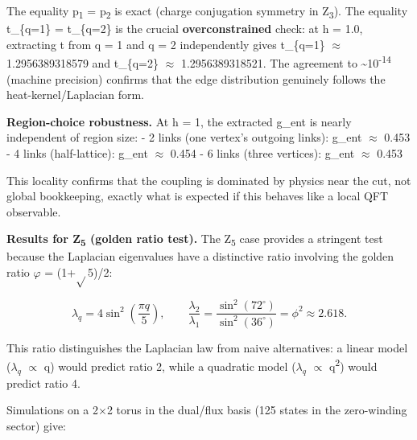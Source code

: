\documentclass[11pt,a4paper]{article}
\theoremstyle{remark}
\begin{document}
The equality p\textsubscript{1} = p\textsubscript{2} is exact (charge conjugation symmetry in Z\textsubscript{3}).
The equality t\_\{q=1\} = t\_\{q=2\} is the crucial \textbf{overconstrained} check: at
h = 1.0, extracting t from q = 1 and q = 2 independently gives
t\_\{q=1\} \ensuremath{\approx} 1.2956389318579 and t\_\{q=2\} \ensuremath{\approx} 1.2956389318521. The
agreement to \textasciitilde10\textsuperscript{-14} (machine precision) confirms that the edge
distribution genuinely follows the heat-kernel/Laplacian form.

\textbf{Region-choice robustness.} At h = 1, the extracted g\_ent
is nearly independent of region size:
- 2 links (one vertex's outgoing links): g\_ent \ensuremath{\approx} 0.453
- 4 links (half-lattice): g\_ent \ensuremath{\approx} 0.454
- 6 links (three vertices): g\_ent \ensuremath{\approx} 0.453

This locality confirms that the coupling is dominated by physics near the cut,
not global bookkeeping, exactly what is expected if this behaves like a local
QFT observable.

\textbf{Results for Z\textsubscript{5} (golden ratio test).} The Z\textsubscript{5} case
provides a stringent test because the Laplacian eigenvalues have a distinctive
ratio involving the golden ratio \ensuremath{\varphi} = (1+\ensuremath{\sqrt{}}5)/2:

\[
\lambda_q = 4\sin^2\left(\frac{\pi q}{5}\right), \qquad
\frac{\lambda_2}{\lambda_1} = \frac{\sin^2(72^\circ)}{\sin^2(36^\circ)} = \phi^2 \approx 2.618.
\]

This ratio distinguishes the Laplacian law from naive alternatives: a linear
model (\(\lambda_q\) \ensuremath{\propto} q) would predict ratio 2, while a quadratic model
(\(\lambda_q\) \ensuremath{\propto} q\textsuperscript{2}) would predict ratio 4.

Simulations on a 2\ensuremath{\times}2 torus in the dual/flux basis (125 states in the
zero-winding sector) give:
\end{document}
